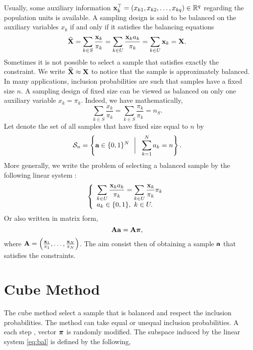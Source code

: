 \documentclass[12pt,english]{article}\usepackage[]{graphicx}\usepackage{xcolor}
\begin{document}
Usually, some auxiliary information ${\bf x}_k^\top = (x_{k1},x_{k2},\dots,x_{kq}) \in\mathbb{R}^q$  regarding the population units is available. A sampling design is said to be balanced on the auxiliary variables $x_k$ if and only if it satisfies the balancing equations
\begin{equation*}\label{eq:balance}
  \widehat{{\bf X}} = \sum_{k\in S} \frac{{\bf x}_k}{\pi_k}  =  \sum_{k\in U} \frac{{\bf x}_k a_k}{\pi_k}= \sum_{k\in U} {\bf x}_k = {\bf X}.
\end{equation*}
Sometimes it is not possible to select a sample that satisfies exactly the constraint. We write $\widehat{{\bf X}} \approx {\bf X}$  to notice that the sample is approximately balanced. In many applications, inclusion probabilities are such that samples have a fixed size $n$. A sampling design of fixed size can be viewed as balanced on only one auxiliary variable $x_k = \pi_k$. Indeed, we have mathematically,
\begin{equation*}
\sum_{k\in S} \frac{x_k}{\pi_k} = \sum_{k \in S}\frac{\pi_k}{\pi_k} =  n_S.
\end{equation*}
Let denote the set of all samples that have fixed size equal to $n$ by
 \begin{equation*}\label{eq:sn} \mathcal{S}_n = \left\{ \textbf{a}\in \{0,1\}^N ~~\bigg|~~ \sum_{k
= 1}^N a_k = n \right\} .
 \end{equation*}
More generally, we write the problem of selecting a balanced sample by the following linear system :
\begin{equation*}\left\{\begin{array}{lll}
\displaystyle\sum_{k\in U}\frac{{\bf x}_k a_k}{\pi_k} =\sum_{k\in U} \frac{{\bf x}_k}{\pi_k}\pi_k\\
a_k \in\{0,1\}, ~ k\in U.

\end{array}\right.
\end{equation*}
Or also written in matrix form,
\begin{equation}\label{eq:bal} {\bf A}{\bf a} = {\bf A}\boldsymbol{\pi},
\end{equation}
where ${\bf A}= \left( \frac{{\bf x}_1}{\pi_1},\dots, \frac{{\bf x}_N}{\pi_N}\right)$. The aim consist then of obtaining a sample ${\bf a}$ that satisfies the constraints.

\section{Cube Method}
The cube method select a sample that is balanced and respect the inclusion probabilities. The method can take equal or unequal inclusion probabilities. A each step , vector $\boldsymbol{\pi}$ is randomly modified. The subspace induced by the linear system \eqref{eq:bal} is defined by the following,
\end{document}
